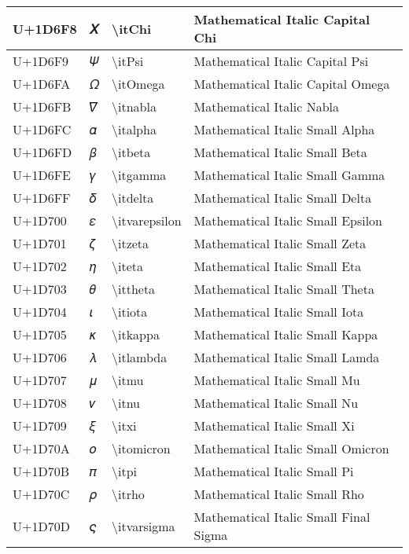 \begin{table}[h]
\begin{tabulary}{\linewidth}{|L|L|L|L|}
\hline
U+1D6F8 & 𝛸 & {\textbackslash}itChi & Mathematical Italic Capital Chi \\
\hline
U+1D6F9 & 𝛹 & {\textbackslash}itPsi & Mathematical Italic Capital Psi \\
\hline
U+1D6FA & 𝛺 & {\textbackslash}itOmega & Mathematical Italic Capital Omega \\
\hline
U+1D6FB & 𝛻 & {\textbackslash}itnabla & Mathematical Italic Nabla \\
\hline
U+1D6FC & 𝛼 & {\textbackslash}italpha & Mathematical Italic Small Alpha \\
\hline
U+1D6FD & 𝛽 & {\textbackslash}itbeta & Mathematical Italic Small Beta \\
\hline
U+1D6FE & 𝛾 & {\textbackslash}itgamma & Mathematical Italic Small Gamma \\
\hline
U+1D6FF & 𝛿 & {\textbackslash}itdelta & Mathematical Italic Small Delta \\
\hline
U+1D700 & 𝜀 & {\textbackslash}itvarepsilon & Mathematical Italic Small Epsilon \\
\hline
U+1D701 & 𝜁 & {\textbackslash}itzeta & Mathematical Italic Small Zeta \\
\hline
U+1D702 & 𝜂 & {\textbackslash}iteta & Mathematical Italic Small Eta \\
\hline
U+1D703 & 𝜃 & {\textbackslash}ittheta & Mathematical Italic Small Theta \\
\hline
U+1D704 & 𝜄 & {\textbackslash}itiota & Mathematical Italic Small Iota \\
\hline
U+1D705 & 𝜅 & {\textbackslash}itkappa & Mathematical Italic Small Kappa \\
\hline
U+1D706 & 𝜆 & {\textbackslash}itlambda & Mathematical Italic Small Lamda \\
\hline
U+1D707 & 𝜇 & {\textbackslash}itmu & Mathematical Italic Small Mu \\
\hline
U+1D708 & 𝜈 & {\textbackslash}itnu & Mathematical Italic Small Nu \\
\hline
U+1D709 & 𝜉 & {\textbackslash}itxi & Mathematical Italic Small Xi \\
\hline
U+1D70A & 𝜊 & {\textbackslash}itomicron & Mathematical Italic Small Omicron \\
\hline
U+1D70B & 𝜋 & {\textbackslash}itpi & Mathematical Italic Small Pi \\
\hline
U+1D70C & 𝜌 & {\textbackslash}itrho & Mathematical Italic Small Rho \\
\hline
U+1D70D & 𝜍 & {\textbackslash}itvarsigma & Mathematical Italic Small Final Sigma \\

\end{tabulary}
\end{table}
